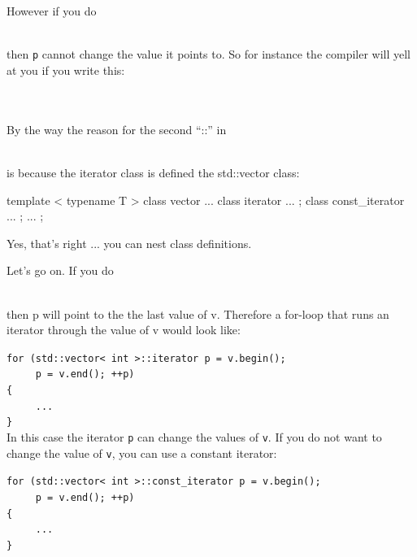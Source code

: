\\
\\

However if you do

\\

then \texttt{p} cannot change the value it points to. So for instance the
compiler will yell at you if you write this:

\\
\\

By the way the reason for the second ``::'' in

\\

is because the iterator class is defined  the std::vector
class:

\begin{console}
template < typename T >
class vector
{
...
    class iterator
    {
        ...
    };  
    class const_iterator
    {
        ...
    };
    ...
};
\end{console}

Yes, that's right ... you can nest class definitions.

Let's go on. If you do

\\

then p will point to the  the last value
of v. Therefore a for-loop that runs an iterator through the value of v
would look like:

\verb!for (std::vector< int >::iterator p = v.begin();!\\
\verb!     p = v.end(); ++p)!\\
\verb!{!\\
\verb!     ...!\\
\verb!}!\\

In this case the iterator \texttt{p} can change the values of \texttt{v}. If
you do not want to change the value of \texttt{v}, you can use a constant
iterator:

\verb!for (std::vector< int >::const_iterator p = v.begin();!\\
\verb!     p = v.end(); ++p)!\\
\verb!{!\\
\verb!     ...!\\
\verb!}!\\

